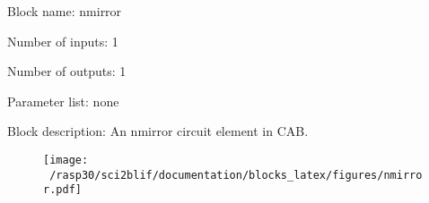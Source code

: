 \pagebreak

Block name: nmirror

Number of inputs: 1

Number of outputs: 1

Parameter list: none

Block description: 
An nmirror circuit element in CAB.

\begin{figure}[H]  %
\texttt{[image: ~/rasp30/sci2blif/documentation/blocks\_latex/figures/nmirror.pdf]}
\end{figure}

